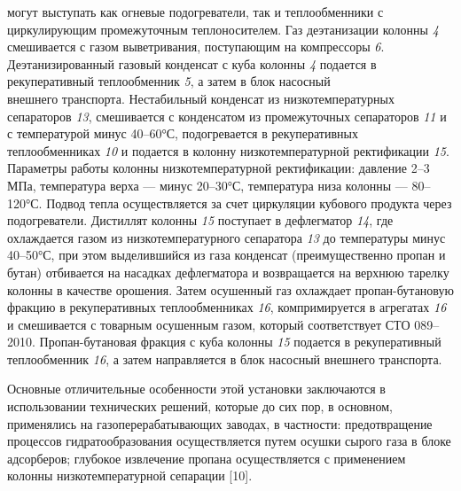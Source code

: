 могут выступать как огневые подогреватели, так и теплообменники с
циркулирующим промежуточным теплоносителем. Газ деэтанизации колонны
\emph{4} смешивается с газом выветривания, поступающим на компрессоры
\emph{6}. Деэтанизированный газовый конденсат с куба колонны \emph{4}
подается в рекуперативный теплообменник \emph{5}, а затем в блок
насосный\\
внешнего транспорта. Нестабильный конденсат из низкотемпературных
сепараторов \emph{13}, смешивается с конденсатом из промежуточных
сепараторов \emph{11} и с температурой минус 40--60°С, подогревается в
рекуперативных теплообменниках \emph{10} и подается в колонну
низкотемпературной ректификации \emph{15}. Параметры работы колонны
низкотемпературной ректификации: давление 2--3 МПа, температура верха
--- минус 20--30°С, температура низа колонны --- 80--120°С. Подвод тепла
осуществляется за счет циркуляции кубового продукта через подогреватели.
Дистиллят колонны \emph{15} поступает в дефлегматор \emph{14}, где
охлаждается газом из низкотемпературного сепаратора \emph{13} до
температуры минус 40--50°С, при этом выделившийся из газа конденсат
(преимущественно пропан и бутан) отбивается на насадках дефлегматора и
возвращается на верхнюю тарелку колонны в качестве орошения. Затем
осушенный газ охлаждает пропан-бутановую фракцию в рекуперативных
теплообменниках \emph{16}, компримируется в агрегатах \emph{16} и
смешивается с товарным осушенным газом, который соответствует СТО
089--2010. Пропан-бутановая фракция с куба колонны \emph{15} подается в
рекуперативный теплообменник \emph{16}, а затем направляется в блок
насосный внешнего транспорта.

Основные отличительные особенности этой установки заключаются в
использовании технических решений, которые до сих пор, в основном,
применялись на газоперерабатывающих заводах, в частности: предотвращение
процессов гидратообразования осуществляется путем осушки сырого газа в
блоке адсорберов; глубокое извлечение пропана осуществляется с
применением колонны низкотемпературной сепарации {[}10{]}.

